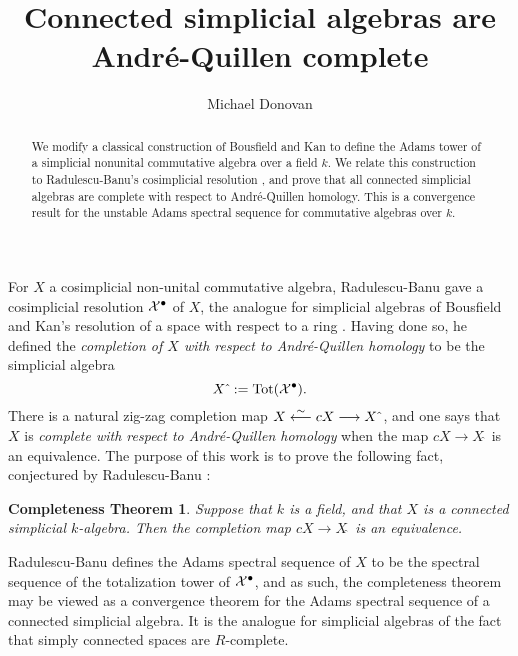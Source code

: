 \documentclass[11pt]{amsart}
\title{Connected simplicial algebras are Andr\'e-Quillen complete}
\author{Michael Donovan}
\theoremstyle{plain}
\newtheorem*{completenesstheorem}{Completeness Theorem}
\begin{document}
\maketitle

\begin{abstract}
We modify a classical construction of Bousfield and Kan \cite{BousKanSSeq.pdf} to define the Adams tower of a simplicial nonunital commutative algebra over a field $k$. We relate this construction to Radulescu-Banu's cosimplicial resolution \cite{radelescuBanu.pdf}, and prove that all connected simplicial algebras are complete with respect to Andr\'e-Quillen homology. This is a convergence result for the unstable Adams spectral sequence for commutative algebras over $k$.
\end{abstract}
For $X$ a cosimplicial non-unital commutative algebra, Radulescu-Banu \cite{radelescuBanu.pdf} gave a cosimplicial resolution $\mathcal{X}^\bullet$ of $X$, the analogue for simplicial algebras of Bousfield and Kan's resolution of a space with respect to a ring \cite{BousKanSSeq.pdf}. Having done so, he defined the \emph{completion of $X$ with respect to Andr\'e-Quillen homology} to be the simplicial algebra
\[X\hat{\ }:=\textup{Tot}(\calX^\bullet).\]
There is a natural zig-zag completion map $X\overset{\sim}{\longleftarrow} cX\longrightarrow X\hat{\ }$, and one says that $X$ is \emph{complete with respect to Andr\'e-Quillen homology} when the map $cX\to X\hat{\ }$ is an equivalence. The purpose of this work is to prove the following fact, conjectured by Radulescu-Banu \cite{radelescuBanu.pdf}:
\begin{completenesstheorem}\label{completenesstheorem}
Suppose that $k$ is a field, and that $X$ is a connected simplicial $k$-algebra. Then the completion map $cX\to X\hat{\ }$ is an equivalence.
\end{completenesstheorem}
\noindent Radulescu-Banu defines the Adams spectral sequence of $X$ to be the spectral sequence of the totalization tower of $\mathcal{X}^\bullet$, and as such, the completeness theorem may be viewed as a convergence theorem for the Adams spectral sequence of a connected simplicial algebra. It is the analogue for simplicial algebras of the fact that simply connected spaces are $R$-complete.
\end{document}
